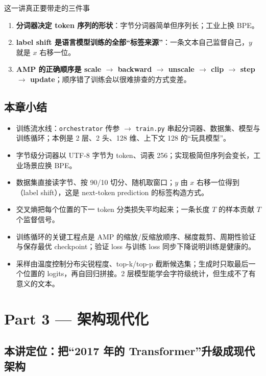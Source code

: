 \begin{importantbox}{这一讲真正要带走的三件事}
\begin{enumerate}
\item \textbf{分词器决定 token 序列的形状}：字节分词器简单但序列长；工业上换 BPE。
\item \textbf{label shift 是语言模型训练的全部“标签来源”}：一条文本自己监督自己，$y$ 就是 $x$ 右移一位。
\item \textbf{AMP 的正确顺序是 scale $\rightarrow$ backward $\rightarrow$ unscale $\rightarrow$ clip $\rightarrow$ step $\rightarrow$ update}；顺序错了训练会以很难排查的方式变差。
\end{enumerate}
\end{importantbox}

\subsection{本章小结}

\begin{itemize}
\item 训练流水线：\texttt{orchestrator} 传参 $\rightarrow$ \texttt{train.py} 串起分词器、数据集、模型与训练循环；本例是 2 层、2 头、128 维、上下文 128 的“玩具模型”。
\item 字节级分词器以 UTF-8 字节为 token、词表 256；实现极简但序列会变长，工业场景应换 BPE。
\item 数据集直接读字节、按 90/10 切分、随机取窗口；$y$ 由 $x$ 右移一位得到（label shift），这是 next-token prediction 的标签构造方式。
\item 交叉熵把每个位置的下一 token 分类损失平均起来；一条长度 $T$ 的样本贡献 $T$ 个监督信号。
\item 训练循环的关键工程点是 AMP 的缩放/反缩放顺序、梯度裁剪、周期性验证与保存最优 checkpoint；验证 loss 与训练 loss 同步下降说明训练是健康的。
\item 采样由温度控制分布尖锐程度、top-k/top-p 截断候选集；生成时只取最后一个位置的 logits，再自回归拼接。2 层模型能学会字符级统计，但生成不了有意义的文本。
\end{itemize}


\section{Part 3 — 架构现代化}

\subsection{本讲定位：把“2017 年的 Transformer”升级成现代架构}

